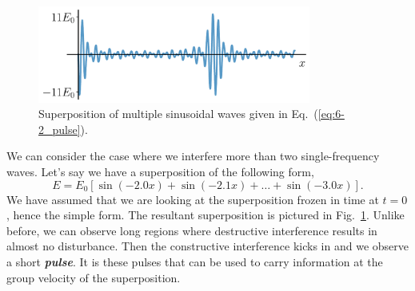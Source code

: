 




\begin{figure}[t]
   \centering
    \includegraphics[width=0.8\textwidth]{lesson6/6-2_superpostion_many.pdf}    
        \caption[Pulse]{Superposition of multiple sinusoidal waves given in Eq.~(\ref{eq:6-2_pulse}).}
        \label{fig:6-2_pulse}
\end{figure}
We can consider the case where we interfere more than two single-frequency waves.
Let's say we have a superposition of the following form,
\begin{equation}
    E = E_0 [\sin(-2.0x) + \sin(-2.1x) + \ldots + \sin(-3.0x)].
    \label{eq:6-2_pulse}
\end{equation}
We have assumed that we are looking at the superposition frozen in time at $t=0$, hence the simple form.
The resultant superposition is pictured in Fig.~\ref{fig:6-2_pulse}.
Unlike before, we can observe long regions where destructive interference results in almost no disturbance.
Then the constructive interference kicks in and we observe a short \textit{\textbf{pulse}}.
It is these pulses that can be used to carry information at the group velocity of the superposition.




